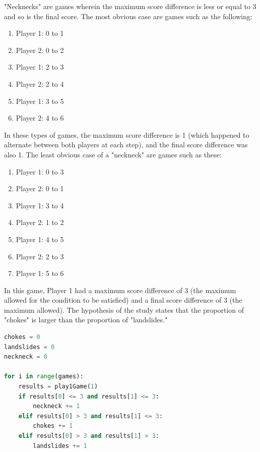 \documentclass{article}
\begin{document}
"Necknecks" are games wherein the maximum score difference is less or equal to 3 and so is the final score. The most obvious case are games such as the following:
\begin{enumerate}
	\item Player 1: 0 to 1
	\item Player 2: 0 to 2
	\item Player 1: 2 to 3
	\item Player 2: 2 to 4
	\item Player 1: 3 to 5
	\item Player 2: 4 to 6
\end{enumerate}
In these types of games, the maximum score difference is 1 (which happened to alternate between both players at each step), and the final score difference was also 1. The least obvious case of a "neckneck" are games such as these:
\begin{enumerate}
	\item Player 1: 0 to 3
	\item Player 2: 0 to 1
	\item Player 1: 3 to 4
	\item Player 2: 1 to 2
	\item Player 1: 4 to 5
	\item Player 2: 2 to 3
	\item Player 1: 5 to 6
\end{enumerate}
In this game, Player 1 had a maximum score difference of 3 (the maximum allowed for the condition to be satisfied) and a final score difference of 3 (the maximum allowed). The hypothesis of the study states that the proportion of "chokes" is larger than the proportion of "landslides."
\begin{lstlisting}[language=Python]
chokes = 0
landslides = 0
neckneck = 0

for i in range(games):
    results = play1Game(1)
    if results[0] <= 3 and results[1] <= 3:
        neckneck += 1
    elif results[0] > 3 and results[1] <= 3:
        chokes += 1
    elif results[0] > 3 and results[1] > 3:
        landslides += 1
\end{lstlisting}
\end{document}
